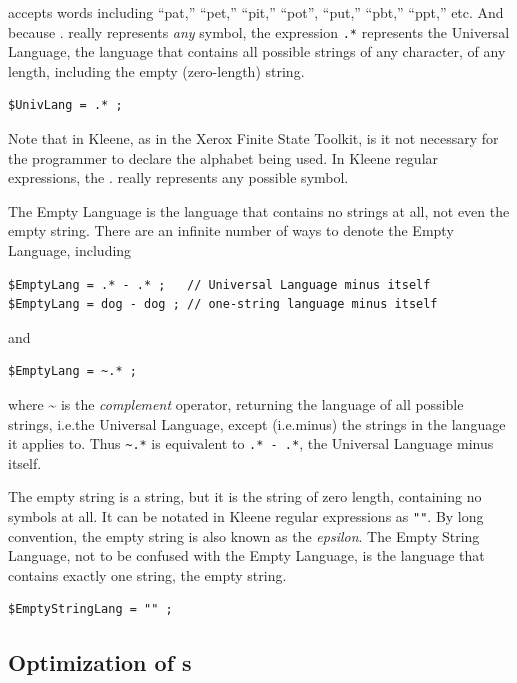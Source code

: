 \noindent
accepts words including ``pat,'' ``pet,'' ``pit,'' ``pot'',
``put,'' ``pbt,'' ``ppt,'' etc.  And because . really 
represents \emph{any} symbol, the expression
\verb!.*! represents the Universal Language, the language that contains all possible
strings of any character, of any length, including the empty (zero-length) string.

\begin{Verbatim}
$UnivLang = .* ;
\end{Verbatim}

\noindent
Note that in Kleene, as in the Xerox Finite State Toolkit, is it not necessary
for the programmer to declare the alphabet being used.  In Kleene regular
expressions, the . really represents any possible symbol.

The Empty Language is the language that contains no strings at all, not even the empty
string.  There are an infinite number of ways to denote the Empty Language, including

\begin{Verbatim}
$EmptyLang = .* - .* ;   // Universal Language minus itself
$EmptyLang = dog - dog ; // one-string language minus itself
\end{Verbatim}

\noindent
and

\begin{Verbatim}
$EmptyLang = ~.* ;
\end{Verbatim}

\noindent
where \~{} is the \emph{complement} operator, returning the language of all possible
strings, i.e.\@ the Universal Language, except
(i.e.\@ minus) the strings in the language it applies to.  Thus \texttt{\~{}.*} is
equivalent to \texttt{.* - .*}, the Universal Language minus itself.

The empty string is a string, but it is the string of zero length, containing no symbols at all.  It can be
notated in Kleene regular expressions as \verb!""!.  By long convention, the empty string is
also known as the \emph{epsilon}.  The Empty String Language, not to be confused with the Empty
Language, is the language that contains exactly one string, the empty string.

\begin{Verbatim}
$EmptyStringLang = "" ;
\end{Verbatim}

\subsection{Optimization of \fsm{}s}

